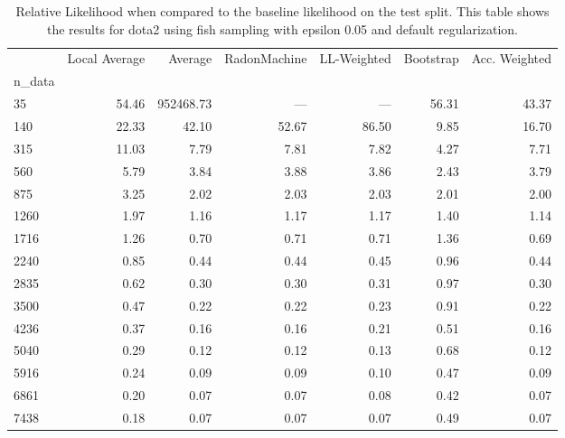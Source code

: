 \begin{table}
\centering
\caption{Relative Likelihood when compared to the baseline likelihood on the test split. This table shows the results for  dota2 using  fish sampling with epsilon  0.05 and  default regularization.}
\label{tab:9}
\begin{tabular}{lrrrrrr}
\toprule
{} &  Local Average &   Average &  RadonMachine &  LL-Weighted &  Bootstrap &  Acc. Weighted \\
n\_data &                &           &               &              &            &                \\
\midrule
35     &          54.46 & 952468.73 &           --- &          --- &      56.31 &          43.37 \\
140    &          22.33 &     42.10 &         52.67 &        86.50 &       9.85 &          16.70 \\
315    &          11.03 &      7.79 &          7.81 &         7.82 &       4.27 &           7.71 \\
560    &           5.79 &      3.84 &          3.88 &         3.86 &       2.43 &           3.79 \\
875    &           3.25 &      2.02 &          2.03 &         2.03 &       2.01 &           2.00 \\
1260   &           1.97 &      1.16 &          1.17 &         1.17 &       1.40 &           1.14 \\
1716   &           1.26 &      0.70 &          0.71 &         0.71 &       1.36 &           0.69 \\
2240   &           0.85 &      0.44 &          0.44 &         0.45 &       0.96 &           0.44 \\
2835   &           0.62 &      0.30 &          0.30 &         0.31 &       0.97 &           0.30 \\
3500   &           0.47 &      0.22 &          0.22 &         0.23 &       0.91 &           0.22 \\
4236   &           0.37 &      0.16 &          0.16 &         0.21 &       0.51 &           0.16 \\
5040   &           0.29 &      0.12 &          0.12 &         0.13 &       0.68 &           0.12 \\
5916   &           0.24 &      0.09 &          0.09 &         0.10 &       0.47 &           0.09 \\
6861   &           0.20 &      0.07 &          0.07 &         0.08 &       0.42 &           0.07 \\
7438   &           0.18 &      0.07 &          0.07 &         0.07 &       0.49 &           0.07 \\
\bottomrule
\end{tabular}
\end{table}
